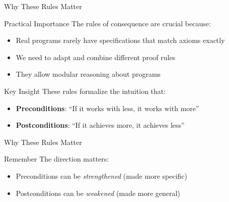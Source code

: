 \begin{frame}{Why These Rules Matter}
    \begin{block}{Practical Importance}
        The rules of consequence are crucial because:
        \begin{itemize}
            \item Real programs rarely have specifications that match axioms exactly
            \item We need to adapt and combine different proof rules
            \item They allow modular reasoning about programs
        \end{itemize}
    \end{block}

    \begin{block}{Key Insight}
        These rules formalize the intuition that:
        \begin{itemize}
            \item \textbf{Preconditions}: ``If it works with less, it works with more''
            \item \textbf{Postconditions}: ``If it achieves more, it achieves less''
        \end{itemize}
    \end{block}
\end{frame}
\begin{frame}{Why These Rules Matter}

    \begin{alertblock}{Remember}
        The direction matters:
        \begin{itemize}
            \item Preconditions can be \emph{strengthened} (made more specific)
            \item Postconditions can be \emph{weakened} (made more general)
        \end{itemize}
    \end{alertblock}
\end{frame}